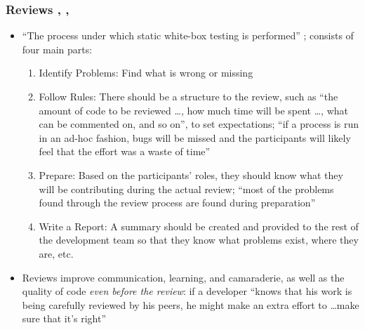 \subsubsection{Reviews \citep[pp.~92-95]{Patton2006},
      \citep[pp.~415-417]{vanVliet2000},
      \citep[pp.~482-485]{PetersAndPedrycz2000}}
\label{reviews}

\begin{itemize}
      \item ``The process under which static white-box testing is performed''
            \citep[p.~92]{Patton2006}; consists of four main parts:

            \begin{enumerate}
                  \item Identify Problems: Find what is wrong or missing
                  \item Follow Rules: There should be a structure to the review,
                        such as ``the amount of code to be reviewed \dots, how
                        much time will be spent \dots, what can be commented on,
                        and so on'', to set expectations; ``if a process is run
                        in an ad-hoc fashion, bugs will be missed and the
                        participants will likely feel that the effort was a
                        waste of time''
                  \item Prepare: Based on the participants' roles, they should
                        know what they will be contributing during the actual
                        review; ``most of the problems found through the review
                        process are found during preparation''
                  \item Write a Report: A summary should be created and provided
                        to the rest of the development team so that they know
                        what problems exist, where they are, etc.
                        \citep[p.~93]{Patton2006}
            \end{enumerate}

      \item Reviews improve communication, learning, and camaraderie, as well as
            the quality of code \emph{even before the review}: if a developer
            ``knows that his work is being carefully reviewed by his peers, he
            might make an extra effort to \dots make sure that it's right''
            \citep[pp.~93-94]{Patton2006}


\end{itemize}
